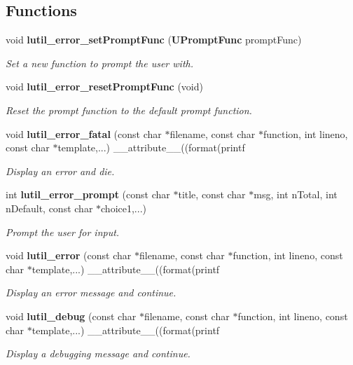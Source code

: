 \subsection*{Functions}
\begin{CompactItemize}
\item 
void {\bf lutil\_\-error\_\-set\-Prompt\-Func} ({\bf UPrompt\-Func} prompt\-Func)
\begin{CompactList}\small\item\em Set a new function to prompt the user with. \item\end{CompactList}\item 
void {\bf lutil\_\-error\_\-reset\-Prompt\-Func} (void)
\begin{CompactList}\small\item\em Reset the prompt function to the default prompt function. \item\end{CompactList}\item 
void {\bf lutil\_\-error\_\-fatal} (const char $\ast$filename, const char $\ast$function, int lineno, const char $\ast$template,...) \_\-\_\-attribute\_\-\_\-((format(printf
\begin{CompactList}\small\item\em Display an error and die. \item\end{CompactList}\item 
int {\bf lutil\_\-error\_\-prompt} (const char $\ast$title, const char $\ast$msg, int n\-Total, int n\-Default, const char $\ast$choice1,...)
\begin{CompactList}\small\item\em Prompt the user for input. \item\end{CompactList}\item 
void {\bf lutil\_\-error} (const char $\ast$filename, const char $\ast$function, int lineno, const char $\ast$template,...) \_\-\_\-attribute\_\-\_\-((format(printf
\begin{CompactList}\small\item\em Display an error message and continue. \item\end{CompactList}\item 
void {\bf lutil\_\-debug} (const char $\ast$filename, const char $\ast$function, int lineno, const char $\ast$template,...) \_\-\_\-attribute\_\-\_\-((format(printf
\begin{CompactList}\small\item\em Display a debugging message and continue. \item\end{CompactList}\end{CompactItemize}


